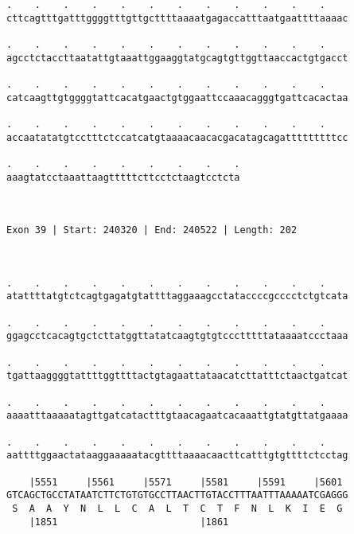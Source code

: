 \documentclass{article}
\begin{document}
\begin{Verbatim}
.    .    .    .    .    .    .    .    .    .    .    .    
cttcagtttgatttggggtttgttgcttttaaaatgagaccatttaatgaattttaaaac
                                                            
.    .    .    .    .    .    .    .    .    .    .    .    
agcctctaccttaatattgtaaattggaaggtatgcagtgttggttaaccactgtgacct
                                                            
.    .    .    .    .    .    .    .    .    .    .    .    
catcaagttgtggggtattcacatgaactgtggaattccaaacagggtgattcacactaa
                                                            
.    .    .    .    .    .    .    .    .    .    .    .    
accaatatatgtcctttctccatcatgtaaaacaacacgacatagcagatttttttttcc
                                                            
.    .    .    .    .    .    .    .    .
aaagtatcctaaattaagtttttcttcctctaagtcctcta
                                         
                                         
 
Exon 39 | Start: 240320 | End: 240522 | Length: 202



.    .    .    .    .    .    .    .    .    .    .    .    
atattttatgtctcagtgagatgtattttaggaaagcctataccccgcccctctgtcata
                                                            
.    .    .    .    .    .    .    .    .    .    .    .    
ggagcctcacagtgctcttatggttatatcaagtgtgtccctttttataaaatccctaaa
                                                            
.    .    .    .    .    .    .    .    .    .    .    .    
tgattaaggggtattttggttttactgtagaattataacatcttatttctaactgatcat
                                                            
.    .    .    .    .    .    .    .    .    .    .    .    
aaaatttaaaaatagttgatcatactttgtaacagaatcacaaattgtatgttatgaaaa
                                                            
.    .    .    .    .    .    .    .    .    .    .    .    
aattttggaactataaggaaaaatacgttttaaaacaacttcatttgtgttttctcctag
                                                            
    |5551     |5561     |5571     |5581     |5591     |5601 
GTCAGCTGCCTATAATCTTCTGTGTGCCTTAACTTGTACCTTTAATTTAAAAATCGAGGG
 S  A  A  Y  N  L  L  C  A  L  T  C  T  F  N  L  K  I  E  G 
    |1851                         |1861                     
  

\end{Verbatim}
\end{document}
